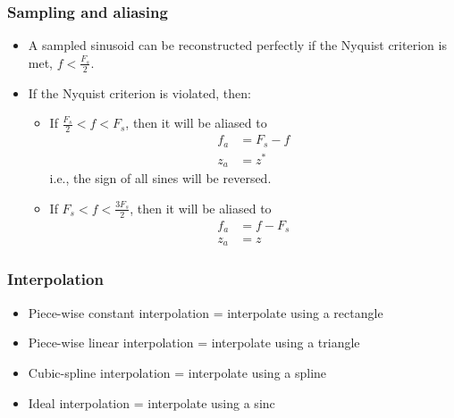 \documentclass{beamer}
\begin{document}
\begin{frame}
  \frametitle{Sampling and aliasing}

  \begin{itemize}
  \item A sampled sinusoid can be reconstructed perfectly if the
    Nyquist criterion is met, $f < \frac{F_s}{2}$.
  \item If the Nyquist criterion is violated, then:
    \begin{itemize}
    \item If $\frac{F_s}{2}<f<F_s$, then it will be aliased to
      \begin{align*}
        f_a &= F_s-f\\
        z_a &= z^*
      \end{align*}
      i.e., the sign of all sines will be reversed.
    \item If $F_s < f < \frac{3F_s}{2}$, then it will be aliased to
      \begin{align*}
        f_a &= f-F_s\\
        z_a &= z
      \end{align*}
    \end{itemize}
  \end{itemize}
\end{frame}

\begin{frame}
  \frametitle{Interpolation}
  \begin{itemize}
  \item Piece-wise constant interpolation = interpolate using a rectangle
  \item Piece-wise linear interpolation = interpolate using a triangle
  \item Cubic-spline interpolation = interpolate using a spline
  \item Ideal interpolation = interpolate using a sinc
  \end{itemize}
\end{frame}
\end{document}
